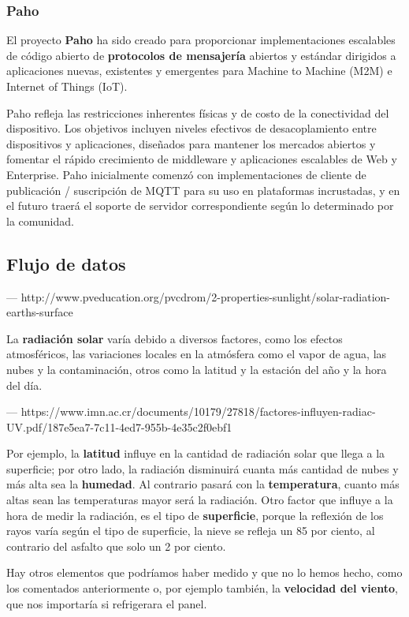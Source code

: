		\subsubsection{Paho}
		El proyecto \textbf{Paho} ha sido creado para proporcionar implementaciones escalables de código abierto de \textbf{protocolos de mensajería} abiertos y estándar dirigidos a aplicaciones nuevas, existentes y emergentes para Machine to Machine (M2M) e Internet of Things (IoT).
		
		Paho refleja las restricciones inherentes físicas y de costo de la conectividad del dispositivo. Los objetivos incluyen niveles efectivos de desacoplamiento entre dispositivos y aplicaciones, diseñados para mantener los mercados abiertos y fomentar el rápido crecimiento de middleware y aplicaciones escalables de Web y Enterprise. Paho inicialmente comenzó con implementaciones de cliente de publicación / suscripción de MQTT para su uso en plataformas incrustadas, y en el futuro traerá el soporte de servidor correspondiente según lo determinado por la comunidad.
		
	\subsection{Flujo de datos}

--- http://www.pveducation.org/pvcdrom/2-properties-sunlight/solar-radiation-earths-surface

La \textbf{radiación solar} varía debido a diversos factores, como los efectos atmosféricos, las variaciones locales en la atmósfera como el vapor de agua, las nubes y la contaminación, otros como la latitud y la estación del año y la hora del día.

--- https://www.imn.ac.cr/documents/10179/27818/factores-influyen-radiac-UV.pdf/187e5ea7-7c11-4ed7-955b-4e35c2f0ebf1

Por ejemplo, la \textbf{latitud} influye en la cantidad de radiación solar que llega a la superficie; por otro lado, la radiación disminuirá cuanta más cantidad de nubes y más alta sea la \textbf{humedad}. Al contrario pasará con la \textbf{temperatura}, cuanto más altas sean las temperaturas mayor será la radiación. Otro factor que influye a la hora de medir la radiación, es el tipo de \textbf{superficie}, porque la reflexión de los rayos varía según el tipo de superficie, la nieve se refleja un 85 por ciento, al contrario del asfalto que solo un 2 por ciento.

Hay otros elementos que podríamos haber medido y que no lo hemos hecho, como los comentados anteriormente o, por ejemplo también, la \textbf{velocidad del viento}, que nos importaría si refrigerara el panel.

